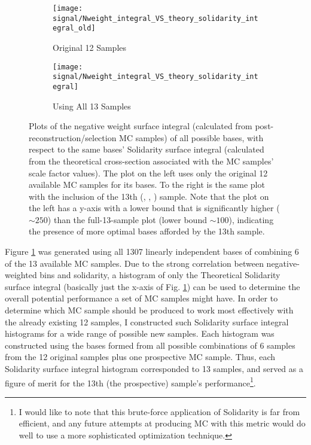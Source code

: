     \begin{figure}[tbh]
        \begin{subfigure}{0.5\textwidth}
            \texttt{[image: signal/Nweight\_integral\_VS\_theory\_solidarity\_integral\_old]}
            \captionsetup{justification=centering} \caption{Original 12 Samples}
        \end{subfigure}
        \begin{subfigure}{0.5\textwidth}
            \texttt{[image: signal/Nweight\_integral\_VS\_theory\_solidarity\_integral]}
            \captionsetup{justification=centering} \caption{Using All 13 Samples}
        \end{subfigure}
        \caption{
            Plots of the negative weight surface integral (calculated from post-reconstruction/selection MC samples)
                of all possible bases, with respect to the same bases' Solidarity surface integral
                (calculated from the theoretical cross-section associated with the MC samples' scale factor values).
            The plot on the left uses only the original 12 available MC samples for its bases.
            To the right is the same plot with the inclusion of the 13th (, , ) sample.
            Note that the plot on the left has a y-axis with a lower bound that is significantly higher ($\sim 250$) 
                than the full-13-sample plot (lower bound $\sim 100$),
                indicating the presence of more optimal bases afforded by the 13th sample.
        }
        \label{fig:nWeight_solidarity_scatter}
    \end{figure}
    \FloatBarrier


    Figure \ref{fig:nWeight_solidarity_scatter} was generated using all 1307 linearly independent bases of combining 6 of the 13 available MC samples.
    Due to the strong correlation between negative-weighted bins and solidarity,
        a histogram of only the Theoretical Solidarity surface integral
        (basically just the x-axis of Fig. \ref{fig:nWeight_solidarity_scatter})
        can be used to determine the overall potential performance a set of MC samples might have.
    In order to determine which MC sample should be produced to work most effectively with the already existing 12 samples,
        I constructed such Solidarity surface integral histograms for a wide range of possible new samples.
    Each histogram was constructed using the bases formed from all possible combinations of 6 samples from
        the 12 original samples plus one prospective MC sample.
    Thus, each Solidarity surface integral histogram corresponded to 13 samples,
        and served as a figure of merit for the 13th (the prospective) sample's performance\footnote{
            I would like to note that this brute-force application of Solidarity is far from efficient,
                and any future attempts at producing MC with this metric
                would do well to use a more sophisticated optimization technique.
        }.

